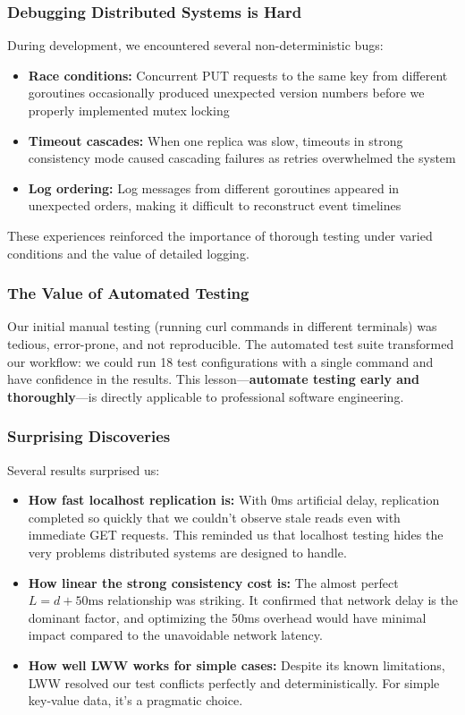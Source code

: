 \documentclass[10pt,a4paper]{article}
\begin{document}
\subsubsection{Debugging Distributed Systems is Hard}

During development, we encountered several non-deterministic bugs:
\begin{itemize}
    \item \textbf{Race conditions:} Concurrent PUT requests to the same key from different goroutines occasionally produced unexpected version numbers before we properly implemented mutex locking
    \item \textbf{Timeout cascades:} When one replica was slow, timeouts in strong consistency mode caused cascading failures as retries overwhelmed the system
    \item \textbf{Log ordering:} Log messages from different goroutines appeared in unexpected orders, making it difficult to reconstruct event timelines
\end{itemize}

These experiences reinforced the importance of thorough testing under varied conditions and the value of detailed logging.

\subsubsection{The Value of Automated Testing}

Our initial manual testing (running curl commands in different terminals) was tedious, error-prone, and not reproducible. The automated test suite transformed our workflow: we could run 18 test configurations with a single command and have confidence in the results. This lesson---\textbf{automate testing early and thoroughly}---is directly applicable to professional software engineering.

\subsubsection{Surprising Discoveries}

Several results surprised us:
\begin{itemize}
    \item \textbf{How fast localhost replication is:} With 0ms artificial delay, replication completed so quickly that we couldn't observe stale reads even with immediate GET requests. This reminded us that localhost testing hides the very problems distributed systems are designed to handle.
    
    \item \textbf{How linear the strong consistency cost is:} The almost perfect $L = d + 50\text{ms}$ relationship was striking. It confirmed that network delay is the dominant factor, and optimizing the 50ms overhead would have minimal impact compared to the unavoidable network latency.
    
    \item \textbf{How well LWW works for simple cases:} Despite its known limitations, LWW resolved our test conflicts perfectly and deterministically. For simple key-value data, it's a pragmatic choice.
\end{itemize}
\end{document}
